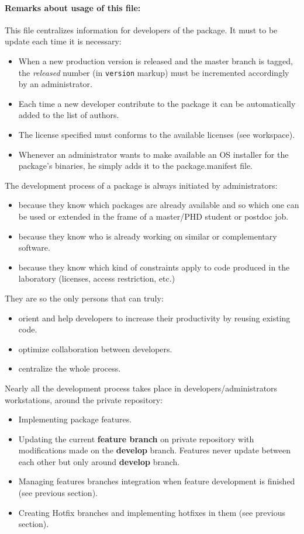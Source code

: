 \documentclass[12pt,a4paper]{article}
\begin{document}
\paragraph{Remarks about usage of this file:}

This file centralizes information for developers of the package. It must to be update each time it is necessary:
\begin{itemize}
\item When a new production version is released and the master branch is tagged, the \textit{released} number (in \texttt{version} markup) must be incremented accordingly by an administrator.
\item Each time a new developer contribute to the package it can be automatically added to the list of authors.
\item The license specified must conforms to the available licenses (see workspace).
\item Whenever an administrator wants to make available an OS installer for the package's binaries, he simply adds it to the package.manifest file.
\end{itemize}  
 
 
The development process of a package is always initiated by administrators:
\begin{itemize}
\item because they know which packages are already available and so which one can be used or extended in the frame of a master/PHD student or postdoc job.
\item because they know who is already working on similar or complementary software.
\item because they know which kind of constraints apply to code produced in the laboratory (licenses, access restriction, etc.)
\end{itemize} 
They are so the only persons that can truly:
\begin{itemize}
\item orient and help developers to increase their productivity by reusing existing code.
\item optimize collaboration between developers.
\item centralize the whole process.
\end{itemize} 


Nearly all the development process takes place in developers/administrators workstations, around the private repository:
\begin{itemize}
\item Implementing package features.
\item Updating the current \textbf{feature branch} on private repository with modifications made on the \textbf{develop} branch. Features never update between each other but only around \textbf{develop} branch. 
\item Managing features branches integration when feature development is finished (see previous section).
\item Creating Hotfix branches and implementing hotfixes in them (see previous section).
\end{itemize}
\end{document}
